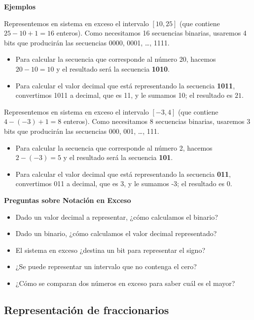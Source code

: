 \documentclass[spanish,A4,]{article}
\begin{document}
\textbf{Ejemplos}

Representemos en sistema en exceso el intervalo $[10, 25]$ (que contiene
$25 - 10 + 1 = 16$ enteros). Como necesitamos 16 secuencias binarias,
usaremos 4 bits que producirán las secuencias 0000, 0001, \ldots{},
1111.

\begin{itemize}
\itemsep1pt\parskip0pt
\item
  Para calcular la secuencia que corresponde al número 20, hacemos
  $20 - 10 = 10$ y el resultado será la secuencia \textbf{1010}.
\item
  Para calcular el valor decimal que está representando la secuencia
  \textbf{1011}, convertimos 1011 a decimal, que es 11, y le sumamos 10;
  el resultado es $21$.
\end{itemize}

Representemos en sistema en exceso el intervalo $[-3, 4]$ (que contiene
$4 -(-3) + 1 = 8$ enteros). Como necesitamos 8 secuencias binarias,
usaremos 3 bits que producirán las secuencias 000, 001, \ldots{}, 111.

\begin{itemize}
\itemsep1pt\parskip0pt
\item
  Para calcular la secuencia que corresponde al número 2, hacemos
  $2 -(-3) = 5$ y el resultado será la secuencia \textbf{101}.
\item
  Para calcular el valor decimal que está representando la secuencia
  \textbf{011}, convertimos 011 a decimal, que es 3, y le sumamos -3; el
  resultado es $0$.
\end{itemize}

\textbf{Preguntas sobre Notación en Exceso}

\begin{itemize}
\itemsep1pt\parskip0pt
\item
  Dado un valor decimal a representar, ¿cómo calculamos el binario?
\item
  Dado un binario, ¿cómo calculamos el valor decimal representado?
\item
  El sistema en exceso ¿destina un bit para representar el signo?
\item
  ¿Se puede representar un intervalo que no contenga el cero?
\item
  ¿Cómo se comparan dos números en exceso para saber cuál es el mayor?
\end{itemize}

\subsection{Representación de
fraccionarios}\label{representaciuxf3n-de-fraccionarios}
\end{document}
